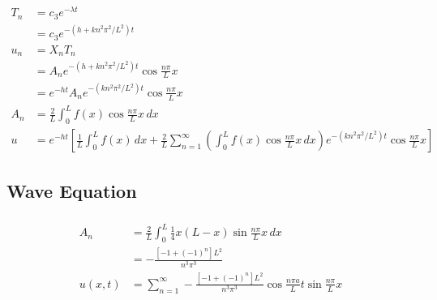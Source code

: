 \documentclass{article}
\begin{document}
\begin{align*}
  T_n                                                  & = c_3 e^{-\lambda t}                                                                                                                                                                                    \\
                                                       & = c_3 e^{-(h + k n^2 \pi^2 / L^2) t}                                                                                                                                                                    \\
  u_n                                                  & = X_n T_n                                                                                                                                                                                               \\
                                                       & = A_n e^{-(h + k n^2 \pi^2 / L^2) t} \cos \frac{n \pi}{L} x                                                                                                                                             \\
                                                       & = e^{-h t} A_n e^{-(k n^2 \pi^2 / L^2) t} \cos \frac{n \pi}{L} x                                                                                                                                        \\
  A_n                                                  & = \frac{2}{L} \int_0^L f(x) \cos \frac{n \pi}{L} x \,d x                                                                                                                                                \\
  u                                                    & = e^{-h t} \left[ \frac{1}{L} \int_0^L f(x) \,d x + \frac{2}{L} \sum_{n = 1}^\infty \left( \int_0^L f(x) \cos \frac{n \pi}{L} x \,d x \right) e^{-(k n^2 \pi^2 / L^2) t} \cos \frac{n \pi}{L} x \right]
\end{align*}

\subsection{Wave Equation}

\subsubsection{}

\begin{align*}
  A_n     & = \frac{2}{L} \int_0^L \frac{1}{4} x (L - x) \sin \frac{n \pi}{L} x \,d x                                  \\
          & = -\frac{[-1 + (-1)^n] L^2}{n^3 \pi^3}                                                                     \\
  u(x, t) & = \sum_{n = 1}^\infty -\frac{[-1 + (-1)^n] L^2}{n^3 \pi^3} \cos \frac{n \pi a}{L} t \sin \frac{n \pi}{L} x
\end{align*}
\end{document}
